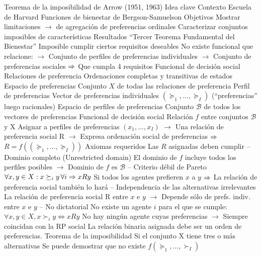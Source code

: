 \documentclass{nuevotema}
\begin{document}
\begin{esquemal}
		\2 Teorema de la imposibilidad de Arrow (1951, 1963)
			\3 Idea clave
				\4 Contexto
				\4[] Escuela de Harvard
				\4[] Funciones de bienestar de Bergson-Samuelson
				\4 Objetivos
				\4[]  Mostrar limitaciones
				\4[] $\to$ de agregación de preferencias ordinales
				\4[] Caracterizar conjuntos imposibles de características
				\4 Resultados
				\4[] ``Tercer Teorema Fundamental del Bienestar''
				\4[] Imposible cumplir ciertos requisitos deseables
				\4[] No existe funcional que relacione:
				\4[] $\to$ Conjunto de perfiles de preferencias individuales
				\4[] $\to$ Conjunto de preferencias sociales
				\4[] $\Rightarrow$ Que cumpla 4 requisitos
			\3 Funcional de decisión social
				\4 Relaciones de preferencia
				\4[] Ordenaciones completas y transitivas de estados
				\4 Espacio de preferencias
				\4[] Conjunto $X$ de todas las relaciones de preferencia
				\4 Perfil de preferencias
				\4[] Vector de preferencias individuales
				\4[] $\left( \succeq_1, ..., \succeq_I \right)$
				\4[] (``preferencias'' luego racionales)
				\4 Espacio de perfiles de preferencias
				\4[] Conjunto $\mathcal{B}$ de todos los vectores de preferencias
				\4 Funcional de decisión social
				\4[] Relación $f$ entre conjuntos $\mathcal{B}$ y X
				\4[] Asignar a perfiles de preferencias $(x_1, ..., x_I)$
				\4[] $\to$ Una relación de preferencia social R
				\4[] $\to$ Expresa ordenación social de preferencias
				\4[] $\Rightarrow$ $R = f \left( (\succeq_1, ..., \succeq_I) \right)$
			\3 Axiomas requeridos
				\4 Las $R$ asignadas deben cumplir
				\4[U] -- Dominio completo (Unrestricted domain)
				\4[] El dominio de $f$ incluye todos los perfiles posibles
				\4[] $\to$ Dominio de $f$ es $\mathcal{B}$
				\4[WP] -- Criterio débil de Pareto
				\4[] $\forall x,y \in X: x \succeq_i y \, \forall i \Rightarrow x R y$
				\4[] Si todos los agentes prefieren $x$ a $y$
				\4[] $\Rightarrow$ La relación de preferencia social también lo hará
				\4[IIA] -- Independencia de las alternativas irrelevantes
				\4[] La relación de preferencia social R entre $x$ e $y$
				\4[] $\to$ Depende sólo de prefs. indiv. entre $x$ e $y$
				\4[D] -- No dictatorial
				\4[] No existe un agente $i$ para el que se cumple:
				\4[] $\forall x, y \in X, x \succ_i y \iff x R y$
				\4[] No hay ningún agente cuyas preferencias
				\4[] $\to$ Siempre coincidan con la RP social
				\4[RP] La relación binaria asignada debe ser un orden de preferencias.
			\3 Teorema de la imposibilidad
				\4 Si el conjunto X tiene tres o más alternativas
				\4[] Se puede demostrar que no existe $f(\succeq_1, ..., \succ_I)$

\end{esquemal}
\end{document}
